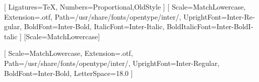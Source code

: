 
\usepackage{fontspec}
\usepackage{polyglossia}
\setdefaultlanguage{french}

\setmainfont{Latin Modern Roman}[
  Ligatures=TeX,
  Numbers={Proportional,OldStyle}
]
\setsansfont{Inter}[
  Scale=MatchLowercase,
  Extension=.otf,
  Path=/usr/share/fonts/opentype/inter/,
  UprightFont=Inter-Regular,
  BoldFont=Inter-Bold,
  ItalicFont=Inter-Italic,
  BoldItalicFont=Inter-BoldItalic
]
\setmonofont{Latin Modern Mono}[Scale=MatchLowercase]

\newfontfamily{}[
  Scale=MatchLowercase,
  Extension=.otf,
  Path=/usr/share/fonts/opentype/inter/,
  UprightFont=Inter-Regular,
  BoldFont=Inter-Bold,
  LetterSpace=18.0
]

\usepackage[
  a4paper,
  top=2.5cm,
  bottom=2.8cm,
  left=2.6cm,
  right=2.6cm,
  headheight=14pt,
  footskip=1.2cm
]{geometry}

\usepackage{xcolor}


\usepackage{amsmath}
\usepackage{amssymb}
\usepackage{graphicx}
\graphicspath{{figures/}{../../docs/logo/}}
\usepackage{float}

